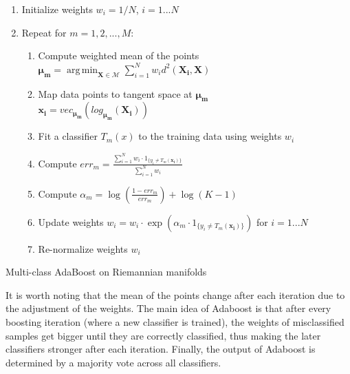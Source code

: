 \documentclass[12pt]{article}
\DeclareMathOperator*{\argmin}{arg\,min}
\DeclareMathOperator*{\argmax}{arg\,max}
\begin{document}
\begin{sloppypar}
\begin{algorithm}[H]
    \begin{enumerate}
    \item Initialize weights $w_{i} = 1/N$, $i = 1...N$\\
    \item Repeat for $m = 1, 2, ..., M$:
        \begin{enumerate}
        \item Compute weighted mean of the points $\bm{\mu_{m}} = \argmin_{\bm{X} \in \mathcal{M}} \sum_{i=1}^{N} w_{i}d^{2}(\bm{X_{i}}, \bm{X}) $\\
        \item Map data points to tangent space at $\bm{\mu_{m}}$\\
        \hspace{0.1cm} $\bm{x_{i}} = vec_{\bm{\mu_{m}}} (log_{\bm{\mu_{m}}}(\bm{X_{i}}))$\\
        \item Fit a classifier $T_{m}(x)$ to the training data using weights $w_{i}$\\
        \item Compute $err_{m} = \frac{\sum_{i=1}^{N} w_{i} \cdot 1_{\{y_{i} \neq T_{m}(\bm{x_{i}})\}}}{\sum_{i=1}^{N} w_{i}}$\\
        \item Compute $\alpha_{m} = \log(\frac{1 - err_{m}}{err_{m}}) + \log(K - 1)$\\
        \item Update weights $w_{i} = w_{i} \cdot \exp(\alpha_{m} \cdot 1_{\{y_{i} \neq T_{m}(\bm{x_{i}})\}})$ for $i = 1...N$\\
        \item Re-normalize weights $w_{i}$ \\
        \end{enumerate}
    \end{enumerate}
    \KwOut{$C(x) = \argmax_k \sum_{m=1}^{M} \alpha_{m} \cdot 1_{\{T_{m}(\bm{x}) = k)\}}$}
    \caption{Multi-class AdaBoost on Riemannian manifolds}
\end{algorithm}
\vspace{5mm}
\noindent
It is worth noting that the mean of the points change after each iteration due to the adjustment of the weights. The main idea of Adaboost is that after every boosting iteration (where a new classifier is trained), the weights of misclassified samples get bigger until they are correctly classified, thus making the later classifiers stronger after each iteration. Finally, the output of Adaboost is determined by a majority vote across all classifiers.



\end{sloppypar}
\end{document}
